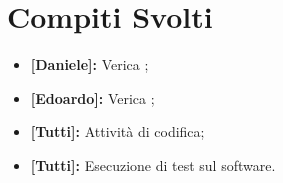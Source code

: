 \documentclass[../verbale-2017-03-31.tex]{subfiles}
\begin{document}
	\section{Compiti Svolti}
	\begin{itemize}
		\item \textbf{[Daniele]:} Verica ;
		\item \textbf{[Edoardo]:} Verica ;
		\item \textbf{[Tutti]:} Attività di codifica;
		\item \textbf{[Tutti]:} Esecuzione di test sul software.
	\end{itemize}
\end{document}
